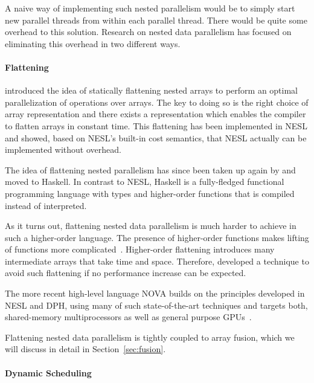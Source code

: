 \documentclass[a4paper]{article}
\begin{document}
A naive way of implementing such nested parallelism would be to simply
start new parallel threads from within each parallel thread. There
would be quite some overhead to this solution. Research on nested data
parallelism has focused on eliminating this overhead in two different
ways.

\paragraph{Flattening}

\citet{Blelloch1993Implementation} introduced the idea of statically
flattening nested arrays to perform an optimal parallelization of
operations over arrays. The key to doing so is the right choice of
array representation and there exists a representation which enables
the compiler to flatten arrays in constant time. This flattening has
been implemented in NESL and \citet{Blelloch:1996:PTS:232627.232650}
showed, based on NESL's built-in cost semantics, that NESL actually
can be implemented without overhead.

The idea of flattening nested parallelism has since been taken up
again by \citet{Lippmeier:2012:WEH:2364527.2364564} and moved to
Haskell. In contrast to NESL, Haskell is a fully-fledged functional
programming language with types and higher-order functions that is
compiled instead of interpreted.

As it turns out, flattening nested data parallelism is much harder to
achieve in such a higher-order language. The presence of higher-order
functions makes lifting of functions more
complicated~\cite{Lippmeier:2012:WEH:2364527.2364564}. Higher-order
flattening introduces many intermediate arrays that take time and
space. Therefore, \citet{Keller:2012:VA:2364506.2364512} developed a
technique to avoid such flattening if no performance increase can be
expected.

The more recent high-level language NOVA builds on the principles
developed in NESL and DPH, using many of such state-of-the-art
techniques and targets both, shared-memory multiprocessors as well as
general purpose GPUs~\cite{Collins:2014:NFL:2627373.2627375}.

Flattening nested data parallelism is tightly coupled to array fusion,
which we will discuss in detail in Section~\ref{sec:fusion}.

\paragraph{Dynamic Scheduling}
\end{document}
